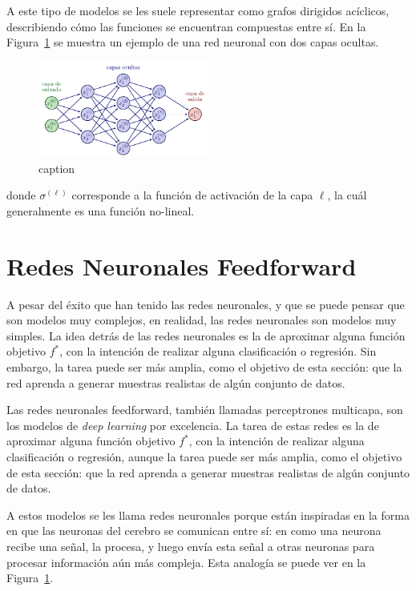 {{A este tipo de modelos se les suele representar como grafos dirigidos acíclicos, describiendo cómo las funciones se encuentran compuestas entre sí. En la Figura~\ref{fig:ejemplo-red-neuronal} se muestra un ejemplo de una red neuronal con dos capas ocultas.

\begin{figure}[htbp]
    \centering
    \includegraphics[width=0.5\textwidth]{img/neural_network/neural_network_feed_forward.pdf}
    \caption{caption}
    \label{fig:ejemplo-red-neuronal}
\end{figure}


donde $\sigma^{(\ell)}$ corresponde a la función de activación de la capa $\ell$, la cuál generalmente es una función no-lineal.

\section{Redes Neuronales Feedforward}\label{sec:redes-neuronales-feedforward}
{
    A pesar del éxito que han tenido las redes neuronales, y que se puede pensar que son modelos muy complejos, en realidad, las redes neuronales son modelos muy simples. La idea detrás de las redes neuronales es la de aproximar alguna función objetivo $f^\ast$, con la intención de realizar alguna clasificación o regresión. Sin embargo, la tarea puede ser más amplia, como el objetivo de esta sección: que la red aprenda a generar muestras realistas de algún conjunto de datos.


}



Las redes neuronales feedforward, también llamadas perceptrones multicapa, son los modelos de \textit{deep learning} por excelencia. La tarea de estas redes es la de aproximar alguna función objetivo $f^\ast$, con la intención de realizar alguna clasificación o regresión, aunque la tarea puede ser más amplia, como el objetivo de esta sección: que la red aprenda a generar muestras realistas de algún conjunto de datos.

A estos modelos se les llama redes neuronales porque están inspiradas en la forma en que las neuronas del cerebro se comunican entre sí: en como una neurona recibe una señal, la procesa, y luego envía esta señal a otras neuronas para procesar información aún más compleja. Esta analogía se puede ver en la Figura~\ref{fig:ejemplo-red-neuronal}.

}}
